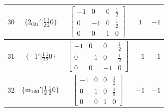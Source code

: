 \documentclass[fleqn,8pt]{jsarticle}
\begin{document}
\begin{longtable}{ccccc}
$ 30 $ & $ \{2{}_{001}{}'|\frac{1}{2} \frac{1}{2} 0\} $ & $ \begin{bmatrix} -1 & 0 & 0 & \frac{1}{2} \\ 0 & -1 & 0 & \frac{1}{2} \\ 0 & 0 & 1 & 0 \end{bmatrix} $ & $ 1 $ & $ -1 $ \\ \hline
$ 31 $ & $ \{-1{}'|\frac{1}{2} \frac{1}{2} 0\} $ & $ \begin{bmatrix} -1 & 0 & 0 & \frac{1}{2} \\ 0 & -1 & 0 & \frac{1}{2} \\ 0 & 0 & -1 & 0 \end{bmatrix} $ & $ -1 $ & $ -1 $ \\ \hline
$ 32 $ & $ \{{\rm m}_{100}{}'|\frac{1}{2} \frac{1}{2} 0\} $ & $ \begin{bmatrix} -1 & 0 & 0 & \frac{1}{2} \\ 0 & 1 & 0 & \frac{1}{2} \\ 0 & 0 & 1 & 0 \end{bmatrix} $ & $ -1 $ & $ -1 $ \\
\end{longtable}
\end{document}
